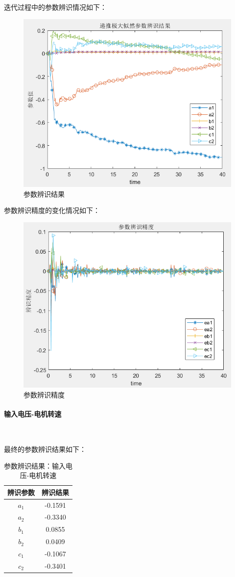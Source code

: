 \documentclass[UTF8, twocolumn]{article}
\begin{document}
迭代过程中的参数辨识情况如下：
\begin{figure}[H]
    \centering %
    \includegraphics[width=.4\textwidth]{figure/极大似然-电机转角-参数辨识结果.png} 
    \caption{参数辨识结果} %
\end{figure}

参数辨识精度的变化情况如下：
\begin{figure}[H]
    \centering %
    \includegraphics[width=.4\textwidth]{figure/极大似然-电机转角-参数辨识精度.png} 
    \caption{参数辨识精度} %
\end{figure}

\paragraph{输入电压-电机转速}~{}

最终的参数辨识结果如下：
\begin{table}[H] %
\centering %
\begin{tabular}{cc} %
	\toprule %
	辨识参数 & 辨识结果 \\
	\midrule %
	$a_1$ & -0.1591 \\
	$a_2$ & -0.3340 \\
	$b_1$ & 0.0855 \\
	$b_2$ & 0.0409 \\
	$c_1$ & -0.1067 \\
    $c_2$ & -0.3401 \\
	\bottomrule %
\end{tabular}
\caption{参数辨识结果：输入电压-电机转速} %
\end{table}
\end{document}
